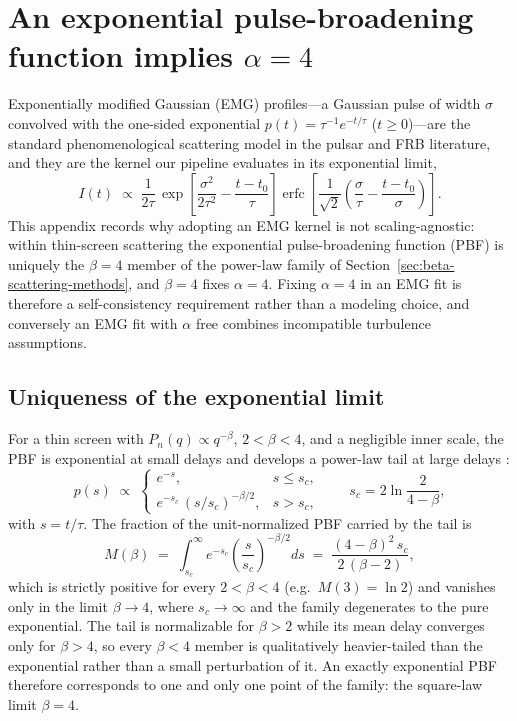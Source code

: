 \section{An exponential pulse-broadening function implies $\alpha=4$}
\label{app:emg-alpha4}

Exponentially modified Gaussian (EMG) profiles---a Gaussian pulse of width
$\sigma$ convolved with the one-sided exponential
$p(t)=\tau^{-1}e^{-t/\tau}$ ($t\ge0$)---are the standard phenomenological
scattering model in the pulsar and FRB literature, and they are the kernel our
pipeline evaluates in its exponential limit,
\begin{equation}
\label{eq:emg}
I(t)\;\propto\;\frac{1}{2\tau}\,
\exp\!\left[\frac{\sigma^{2}}{2\tau^{2}}-\frac{t-t_{0}}{\tau}\right]
\operatorname{erfc}\!\left[\frac{1}{\sqrt{2}}
\left(\frac{\sigma}{\tau}-\frac{t-t_{0}}{\sigma}\right)\right].
\end{equation}
This appendix records why adopting an EMG kernel is not scaling-agnostic:
within thin-screen scattering the exponential pulse-broadening function (PBF)
is uniquely the $\beta=4$ member of the power-law family of
Section~\ref{sec:beta-scattering-methods}, and $\beta=4$ fixes $\alpha=4$.
Fixing $\alpha=4$ in an EMG fit is therefore a self-consistency requirement
rather than a modeling choice, and conversely an EMG fit with $\alpha$ free
combines incompatible turbulence assumptions.

\subsection{Uniqueness of the exponential limit}

For a thin screen with $P_n(q)\propto q^{-\beta}$, $2<\beta<4$, and a
negligible inner scale, the PBF is exponential at small delays and develops a
power-law tail at large delays \citep{Cordes2025}:
\begin{equation}
\label{eq:pbf-family}
p(s)\;\propto\;
\begin{cases}
e^{-s}, & s\le s_{c},\\[2pt]
e^{-s_{c}}\,(s/s_{c})^{-\beta/2}, & s>s_{c},
\end{cases}
\qquad
s_{c}=2\ln\!\frac{2}{4-\beta},
\end{equation}
with $s=t/\tau$. The fraction of the unit-normalized PBF carried by the tail
is
\begin{equation}
\label{eq:tailmass}
M(\beta)\;=\;
\int_{s_{c}}^{\infty} e^{-s_{c}}\!\left(\frac{s}{s_{c}}\right)^{-\beta/2} ds
\;=\;\frac{(4-\beta)^{2}\,s_{c}}{2\,(\beta-2)},
\end{equation}
which is strictly positive for every $2<\beta<4$ (e.g.\ $M(3)=\ln 2$) and
vanishes only in the limit $\beta\to4$, where $s_{c}\to\infty$ and the family
degenerates to the pure exponential. The tail is normalizable for $\beta>2$
while its mean delay converges only for $\beta>4$, so every $\beta<4$ member is
qualitatively heavier-tailed than the exponential rather than a small
perturbation of it. An exactly exponential PBF therefore corresponds to one and
only one point of the family: the square-law limit $\beta=4$.

